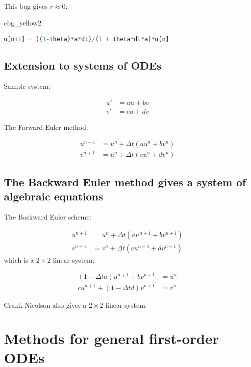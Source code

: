 \documentclass[%
oneside,                 %
final,                   %
10pt]{article}
\newenvironment{_cod_tight}[1]{
   \def\FrameCommand{\colorbox{#1}}
   \FrameRule0.6pt\MakeFramed {\FrameRestore}\vskip3mm}
   {\vskip0mm\endMakeFramed}
\newenvironment{cod}[1]{
\bgroup\rmfamily
\fboxsep=0mm\relax
\begin{_cod_tight}{#1}
\list{}{\parsep=-2mm\parskip=0mm\topsep=0pt\leftmargin=2mm
\rightmargin=2\leftmargin\leftmargin=4pt\relax}
\item\relax}
{\endlist\end{_cod_tight}\egroup}
\begin{document}
This bug gives $r\approx 0$:

\begin{cod}{cbg_yellow2}\begin{lstlisting}[language=Python,style=simple,xleftmargin=2mm]
u[n+1] = ((1-theta)*a*dt)/(1 + theta*dt*a)*u[n]
\end{lstlisting}\end{cod}
\noindent

\subsection*{Extension to systems of ODEs}

Sample system:

\begin{align}
u' &= a u + bv\\ 
v' &= cu +  dv
\end{align}

The Forward Euler method:

\begin{align}
u^{n+1} &= u^n + \Delta t (a u^n + b v^n)\\ 
v^{n+1} &= u^n + \Delta t (cu^n + dv^n)
\end{align}


\subsection*{The Backward Euler method gives a system of algebraic equations}

The Backward Euler scheme:

\begin{align}
u^{n+1} &= u^n + \Delta t (a u^{n+1} + b v^{n+1})\\ 
v^{n+1} &= v^n + \Delta t (c u^{n+1} + d v^{n+1})
\end{align}
which is a $2\times 2$ linear system:

\begin{align}
(1 - \Delta t a)u^{n+1} + bv^{n+1} &= u^n \\ 
c u^{n+1} + (1 - \Delta t d) v^{n+1} &= v^n
\end{align}

Crank-Nicolson also gives a $2\times 2$ linear system.

\section*{Methods for general first-order ODEs}
\label{decay:1stODEs}
\end{document}
